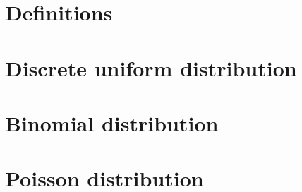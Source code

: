 \documentclass[12pt]{article}
\theoremstyle{definition}
\theoremstyle{definition}
\theoremstyle{theorem}
\begin{document}
	
	\tableofcontents
	\pagebreak
	
	
	\section{Definitions}
	
	
	\section{Discrete uniform distribution}
	
	
	\section{Binomial distribution}
	
	
	\section{Poisson distribution}
	
	
	
	
\end{document}
